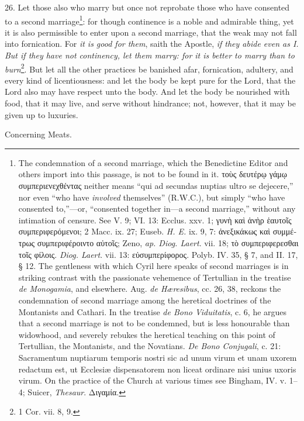 26. Let those also who marry but once not reprobate those who have consented to a second marriage\footnote{The condemnation of a second marriage, which the Benedictine Editor and others import into this passage, is not to be found in it. \textgreek{τοὺς δευτέρῳ γάμῳ συμπεριενεχθέντας} neither means “qui ad secundas nuptias ultro se dejecere,” nor even “who have \emph{involved} themselves” (R.W.C.), but simply “who have consented to,”—or, “consented together in—a second marriage,” without any intimation of censure. See V. 9; VI. 13: Ecclus. xxv. 1; \textgreek{γυνὴ καὶ ἁνὴρ ἑαυτοῖς συμπεριφερόμενοι}; 2 Macc. ix. 27; Euseb. \emph{H. E.} ix. 9, 7: \textgreek{ἀνεξικάκως καὶ συμμέτρως συμπεριφέροιντο αὐτοῖς}; Zeno, \emph{ap. Diog. Laert}. vii. 18; \textgreek{τὸ συμπεριφερεσθαι τοῖς φίλοις}. \emph{Diog. Laert}. vii. 13: \textgreek{εὐσυμπερίφορος}. Polyb. IV. 35, § 7, and II. 17, § 12. The gentleness with which Cyril here speaks of second marriages is in striking contrast with the passionate vehemence of Tertullian in the treatise \emph{de Monogamia}, and elsewhere. Aug. \emph{de Hæresibus}, cc. 26, 38, reckons the condemnation of second marriage among the heretical doctrines of the Montanists and Cathari. In the treatise \emph{de Bono Viduitatis}, c. 6, he argues that a second marriage is not to be condemned, but is less honourable than widowhood, and severely rebukes the heretical teaching on this point of Tertullian, the Montanists, and the Novatians. \emph{De Bono Conjugali}, c. 21: Sacramentum nuptiarum temporis nostri sic ad unum virum et unam uxorem redactum est, ut Ecclesiæ dispensatorem non liceat ordinare nisi unius uxoris virum. On the practice of the Church at various times see Bingham, IV. v. 1–4; Suicer, \emph{Thesaur}. \textgreek{Διγαμία}.}: for though continence is a noble and admirable thing, yet it is also permissible to enter upon a second marriage, that the weak may not fall into fornication. For \emph{it is good for them}, saith the Apostle, \emph{if they abide even as I. But if they have not continency, let them marry: for it is better to marry than to burn}\footnote{1 Cor. vii. 8, 9.}. But let all the other practices be banished afar, fornication, adultery, and every kind of licentiousness: and let the body be kept pure for the Lord, that the Lord also may have respect unto the body. And let the body be nourished with food, that it may live, and serve without hindrance; not, however, that it may be given up to luxuries.

Concerning Meats.

